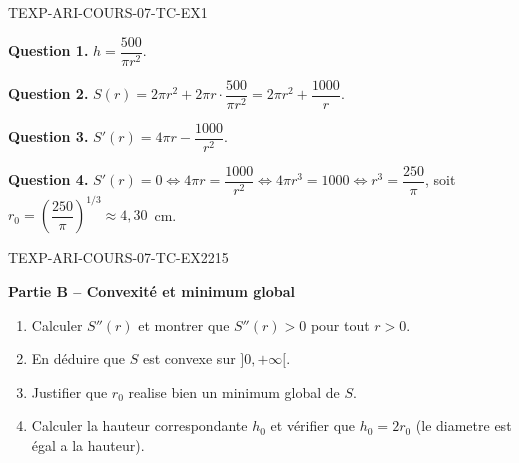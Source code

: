 \begin{corrige}{TEXP-ARI-COURS-07-TC-EX1}

\textbf{Question 1.} $h = \dfrac{500}{\pi r^2}$.

\textbf{Question 2.} $S(r) = 2\pi r^2 + 2\pi r \cdot \dfrac{500}{\pi r^2} = 2\pi r^2 + \dfrac{1000}{r}$.


\textbf{Question 3.} $S'(r) = 4\pi r - \dfrac{1000}{r^2}$.

\textbf{Question 4.} $S'(r) = 0 \iff 4\pi r = \dfrac{1000}{r^2} \iff 4\pi r^3 = 1000 \iff r^3 = \dfrac{250}{\pi}$, soit $r_0 = \left(\dfrac{250}{\pi}\right)^{1/3} \approx 4{,}30$~cm.

\end{corrige}

\bigskip


\begin{exercice}{TEXP-ARI-COURS-07-TC-EX2}{2}{15}

\textbf{Partie B -- Convexité et minimum global}

\begin{enumerate}
  \item Calculer $S''(r)$ et montrer que $S''(r) > 0$ pour tout $r > 0$.
  \item En déduire que $S$ est convexe sur $]0, +\infty[$.
  \item Justifier que $r_0$ realise bien un minimum global de $S$.
  \item Calculer la hauteur correspondante $h_0$ et vérifier que $h_0 = 2r_0$ (le diametre est égal a la hauteur).
\end{enumerate}

\end{exercice}

